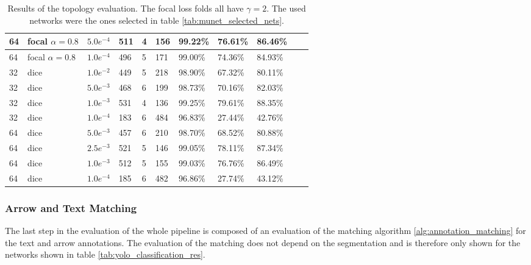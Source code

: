 \begin{table}
\begin{center}
\begin{tabular}{|l|l|l|l|l|l|l|l|l|l|l|}
\hline
64                  & focal $\alpha=0.8$ & $5.0e^{-4}$            & 511 & 4  & 156 & 99.22\%   & 76.61\% & 86.46\% \\
\hline
64                  & focal $\alpha=0.8$ & $1.0e^{-4}$            & 496 & 5  & 171 & 99.00\%   & 74.36\% & 84.93\% \\
\hline
32                  & dice               & $1.0e^{-2}$            & 449 & 5  & 218 & 98.90\%   & 67.32\% & 80.11\% \\
\hline
32                  & dice               & $5.0e^{-3}$            & 468 & 6  & 199 & 98.73\%   & 70.16\% & 82.03\% \\
\hline
32                  & dice               & $1.0e^{-3}$            & 531 & 4  & 136 & 99.25\%   & 79.61\% & 88.35\% \\
\hline
32                  & dice               & $1.0e^{-4}$            & 183 & 6  & 484 & 96.83\%   & 27.44\% & 42.76\% \\
\hline
64                  & dice               & $5.0e^{-3}$            & 457 & 6  & 210 & 98.70\%   & 68.52\% & 80.88\% \\
\hline
64                  & dice               & $2.5e^{-3}$            & 521 & 5  & 146 & 99.05\%   & 78.11\% & 87.34\% \\
\hline
64                  & dice               & $1.0e^{-3}$            & 512 & 5  & 155 & 99.03\%   & 76.76\% & 86.49\% \\
\hline
64                  & dice & $1.0e^{-4}$            & 185 & 6  & 482 & 96.86\%   & 27.74\% & 43.12\% \\
\hline

\end{tabular}
\caption{Results of the topology evaluation. The focal loss folds all have $\gamma = 2$. The used networks were the ones selected in table \ref{tab:munet_selected_nets}.}
\label{tab:topology_test_plain}
\end{center}
\end{table}

\subsubsection{Arrow and Text Matching}

The last step in the evaluation of the whole pipeline is composed of an evaluation of the matching algorithm \ref{alg:annotation_matching} for the text and arrow annotations.
The evaluation of the matching does not depend on the segmentation and is therefore only shown for the networks shown in table \ref{tab:yolo_classification_res}.

